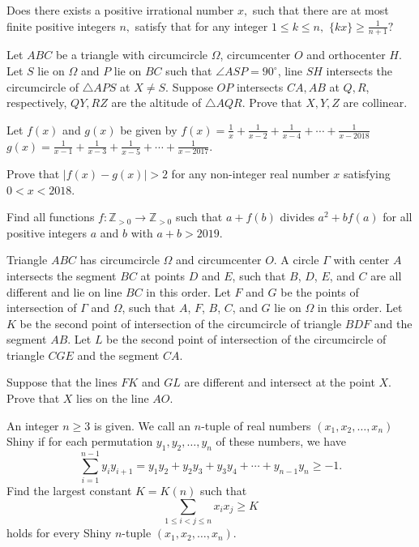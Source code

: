 \documentclass[11pt]{scrartcl}
\begin{document}
\begin{problem}[3400944067868512059]
Does there exists a positive irrational number ${x},$ such that there are at most finite positive integers ${n},$ satisfy that for any integer $1\leq k\leq n,$ $\{kx\}\geq\frac 1{n+1}?$
\end{problem}
\begin{problem}[3417358984411200361]
Let $ABC$ be a triangle with circumcircle $\Omega$, circumcenter $O$ and orthocenter $H$. Let $S$ lie on $\Omega$ and $P$ lie on $BC$ such that $\angle ASP=90^\circ$, line $SH$ intersects the circumcircle of $\triangle APS$ at $X\neq S$. Suppose $OP$ intersects $CA,AB$ at $Q,R$, respectively, $QY,RZ$ are the altitude of $\triangle AQR$. Prove that $X,Y,Z$ are collinear.
\end{problem}
\begin{problem}[3427992889083230961]
Let $f(x)$ and $g(x)$ be given by
$f(x) = \frac{1}{x} + \frac{1}{x-2} + \frac{1}{x-4} + \cdots + \frac{1}{x-2018}$
$g(x) = \frac{1}{x-1} + \frac{1}{x-3} + \frac{1}{x-5} + \cdots + \frac{1}{x-2017}$.

Prove that $|f(x)-g(x)| >2$ for any non-integer real number $x$ satisfying $0 < x < 2018$.
\end{problem}
\begin{problem}[3435532350205377704]
Find all functions $f:\mathbb Z_{>0}\to \mathbb Z_{>0}$ such that $a+f(b)$ divides $a^2+bf(a)$ for all positive integers $a$ and $b$ with $a+b>2019$.
\end{problem}
\begin{problem}[3440185808972009200]
Triangle $ABC$ has circumcircle $\Omega$ and circumcenter $O$. A circle $\Gamma$ with center $A$ intersects the segment $BC$ at points $D$ and $E$, such that $B$, $D$, $E$, and $C$ are all different and lie on line $BC$ in this order. Let $F$ and $G$ be the points of intersection of $\Gamma$ and $\Omega$, such that $A$, $F$, $B$, $C$, and $G$ lie on $\Omega$ in this order. Let $K$ be the second point of intersection of the circumcircle of triangle $BDF$ and the segment $AB$. Let $L$ be the second point of intersection of the circumcircle of triangle $CGE$ and the segment $CA$.

Suppose that the lines $FK$ and $GL$ are different and intersect at the point $X$. Prove that $X$ lies on the line $AO$.
\end{problem}
\begin{problem}[3442101705279585713]
An integer $n \geq 3$ is given. We call an $n$-tuple of real numbers $(x_1, x_2, \dots, x_n)$ Shiny if for each permutation $y_1, y_2, \dots, y_n$ of these numbers, we have
$$\sum \limits_{i=1}^{n-1} y_i y_{i+1} = y_1y_2 + y_2y_3 + y_3y_4 + \cdots + y_{n-1}y_n \geq -1.$$Find the largest constant $K = K(n)$ such that
$$\sum \limits_{1 \leq i < j \leq n} x_i x_j \geq K$$holds for every Shiny $n$-tuple $(x_1, x_2, \dots, x_n)$.
\end{problem}
\end{document}
